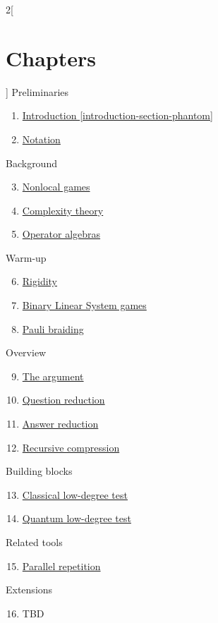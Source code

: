 \begin{multicols}{2}[\section{Chapters}]
\noindent
Preliminaries
\begin{enumerate}
\item \hyperref[introduction-section-phantom]{Introduction \ref*{introduction-section-phantom}}
\item \hyperref[notation-section-phantom]{Notation}
\end{enumerate}
Background
\begin{enumerate}
\setcounter{enumi}{2}
\item \hyperref[nonlocalgames-section-phantom]{Nonlocal games}
\item \hyperref[complexitytheory-section-phantom]{Complexity theory}
\item \hyperref[operatoralgebras-section-phantom]{Operator algebras}
\end{enumerate}
Warm-up
\begin{enumerate}
\setcounter{enumi}{5}
\item \hyperref[rigidity-section-phantom]{Rigidity}
\item \hyperref[blsgames-section-phantom]{Binary Linear System games}
\item \hyperref[paulibraiding-section-phantom]{Pauli braiding}
\end{enumerate}
Overview
\begin{enumerate}
\setcounter{enumi}{8}
\item \hyperref[argument-section-phantom]{The argument}
\item \hyperref[questionreduction-section-phantom]{Question reduction}
\item \hyperref[answerreduction-section-phantom]{Answer reduction}
\item \hyperref[recursivecompression-section-phantom]{Recursive compression}
\end{enumerate}
Building blocks
\begin{enumerate}
\setcounter{enumi}{12}
\item \hyperref[classicalldt-section-phantom]{Classical low-degree test}
\item \hyperref[quantumldt-section-phantom]{Quantum low-degree test}
\end{enumerate}
Related tools
\begin{enumerate}
\setcounter{enumi}{14}
\item \hyperref[parallelrepetition-section-phantom]{Parallel repetition}
\end{enumerate}
Extensions
\begin{enumerate}
\setcounter{enumi}{15}
\item TBD
\end{enumerate}
\end{multicols}